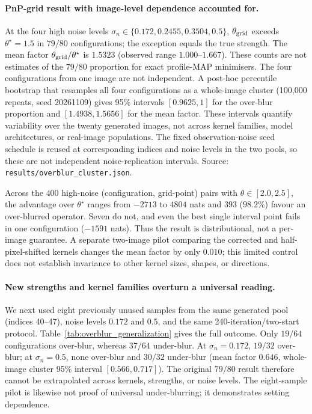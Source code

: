 \documentclass[10pt,journal]{IEEEtran}
\newcommand{\blur}{\star}
\begin{document}
\paragraph*{PnP-grid result with image-level dependence accounted for.}
At the four high noise levels $\sigma_n\in\{0.172,0.2455,0.3504,0.5\}$, $\theta_{\rm grid}$
exceeds $\theta^\blur=1.5$ in $79/80$ configurations; the exception equals the true strength.
The mean factor $\theta_{\rm grid}/\theta^\blur$ is $1.5323$ (observed range
$1.000$--$1.667$). These counts are not estimates of the $79/80$ proportion for exact
profile-MAP minimisers. The four configurations from one image are not independent. A post-hoc
percentile bootstrap that resamples all four configurations as a whole-image cluster (100,000
repeats, seed 20261109) gives 95\% intervals $[0.9625,1]$ for the over-blur proportion and
$[1.4938,1.5656]$ for the mean factor. These intervals quantify variability over the twenty
generated images, not across kernel families, model architectures, or real-image populations.
The fixed observation-noise seed schedule is reused at corresponding indices and noise levels
in the two pools, so these are not independent noise-replication intervals. Source:
\texttt{results/overblur\_cluster.json}.

Across the $400$ high-noise (configuration, grid-point) pairs with $\theta\in[2.0,2.5]$, the
advantage over $\theta^\blur$ ranges from $-2713$ to $4804$ nats and $393$ ($98.2\%$) favour an
over-blurred operator. Seven do not, and even the best single interval point fails in one
configuration ($-1591$ nats). Thus the result is distributional, not a per-image guarantee. A
separate two-image pilot comparing the corrected and half-pixel-shifted kernels changes the mean
factor by only $0.010$; this limited control does not establish invariance to other kernel sizes,
shapes, or directions.

\paragraph*{New strengths and kernel families overturn a universal reading.}
We next used eight previously unused samples from the same generated pool (indices 40--47),
noise levels $0.172$ and $0.5$, and the same 240-iteration/two-start protocol.
Table~\ref{tab:overblur_generalization} gives the full outcome. Only $19/64$ configurations
over-blur, whereas $37/64$ under-blur. At $\sigma_n=0.172$, $19/32$ over-blur; at
$\sigma_n=0.5$, none over-blur and $30/32$ under-blur (mean factor $0.646$, whole-image cluster
95\% interval $[0.566,0.717]$). The original $79/80$ result therefore cannot be extrapolated
across kernels, strengths, or noise levels. The eight-sample pilot is likewise not proof of
universal under-blurring; it demonstrates setting dependence.
\end{document}
